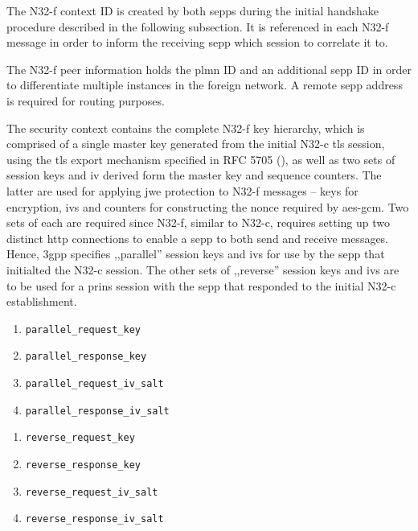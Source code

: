 The N32-f context ID is created by both \glspl{sepp} during the initial handshake procedure described in the following subsection.
It is referenced in each N32-f message in order to inform the receiving \gls{sepp} which session to correlate it to.

The N32-f peer information holds the \gls{plmn} ID and an additional \gls{sepp} ID in order to differentiate multiple instances in the foreign network.
A remote \gls{sepp} address is required for routing purposes.

The security context contains the complete N32-f key hierarchy, which is comprised of a single master key generated from the initial N32-c \gls{tls} session, using the \gls{tls} export mechanism specified in RFC 5705 (\cite{rfc5705}), as well as two sets of session keys and \gls{iv} derived form the master key and sequence counters.
The latter are used for applying \gls{jwe} protection to N32-f messages -- keys for encryption, \glspl{iv} and counters for constructing the nonce required by \gls{aes}-\gls{gcm}.
Two sets of each are required since N32-f, similar to N32-c, requires setting up two distinct \gls{http} connections to enable a \gls{sepp} to both send and receive messages.
Hence, \gls{3gpp} specifies ,,parallel'' session keys and \glspl{iv} for use by the \gls{sepp} that initialted the N32-c session.
The other sets of ,,reverse'' session keys and \glspl{iv} are to be used for a \gls{prins} session with the \gls{sepp} that responded to the initial N32-c establishment.

\begin{minipage}[l]{0.5\textwidth}
    \begin{enumerate}[label=--]
        \item \texttt{parallel\_request\_key}
        \item \texttt{parallel\_response\_key}
        \item \texttt{parallel\_request\_iv\_salt}
        \item \texttt{parallel\_response\_iv\_salt}
    \end{enumerate}
\end{minipage}%
\begin{minipage}[r]{0.5\textwidth}
    \begin{enumerate}[label=--]
        \item \texttt{reverse\_request\_key}
        \item \texttt{reverse\_response\_key}
        \item \texttt{reverse\_request\_iv\_salt}
        \item \texttt{reverse\_response\_iv\_salt}
    \end{enumerate}
\end{minipage}\\

